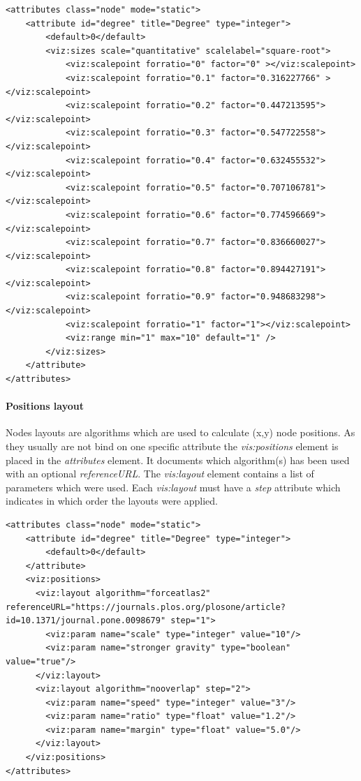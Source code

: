 \documentclass[a4paper,10pt]{article}
\begin{document}
\lstset{ style=gexf }
\begin{lstlisting}[caption={Quantitative size scale},label=vizscalesizequanti]
<attributes class="node" mode="static">
    <attribute id="degree" title="Degree" type="integer">
        <default>0</default>
        <viz:sizes scale="quantitative" scalelabel="square-root">
            <viz:scalepoint forratio="0" factor="0" ></viz:scalepoint>
            <viz:scalepoint forratio="0.1" factor="0.316227766" ></viz:scalepoint>
            <viz:scalepoint forratio="0.2" factor="0.447213595"></viz:scalepoint>
            <viz:scalepoint forratio="0.3" factor="0.547722558"></viz:scalepoint>
            <viz:scalepoint forratio="0.4" factor="0.632455532"></viz:scalepoint>
            <viz:scalepoint forratio="0.5" factor="0.707106781"></viz:scalepoint>
            <viz:scalepoint forratio="0.6" factor="0.774596669"></viz:scalepoint>
            <viz:scalepoint forratio="0.7" factor="0.836660027"></viz:scalepoint>
            <viz:scalepoint forratio="0.8" factor="0.894427191"></viz:scalepoint>
            <viz:scalepoint forratio="0.9" factor="0.948683298"></viz:scalepoint>
            <viz:scalepoint forratio="1" factor="1"></viz:scalepoint>
            <viz:range min="1" max="10" default="1" />
        </viz:sizes>
    </attribute>
</attributes>
\end{lstlisting}

\paragraph{Positions layout} Nodes layouts are algorithms which are used to calculate (x,y) node positions. As they usually are not bind on one specific attribute the \textit{vis:positions} element is placed in the \textit{attributes} element. It documents which algorithm(s) has been used with an optional \textit{referenceURL}. The \textit{vis:layout} element contains a list of parameters which were used. Each \textit{vis:layout} must have a \textit{step} attribute which indicates in which order the layouts were applied.

\lstset{ style=gexf }
\begin{lstlisting}[caption={Positions layout},label=vizpositionlayout]
<attributes class="node" mode="static">
    <attribute id="degree" title="Degree" type="integer">
        <default>0</default>
    </attribute>
    <viz:positions> 
      <viz:layout algorithm="forceatlas2" referenceURL="https://journals.plos.org/plosone/article?id=10.1371/journal.pone.0098679" step="1">
        <viz:param name="scale" type="integer" value="10"/>
        <viz:param name="stronger gravity" type="boolean" value="true"/>
      </viz:layout>
      <viz:layout algorithm="nooverlap" step="2">
        <viz:param name="speed" type="integer" value="3"/>
        <viz:param name="ratio" type="float" value="1.2"/>
        <viz:param name="margin" type="float" value="5.0"/>
      </viz:layout>  
    </viz:positions>
</attributes>
\end{lstlisting}
\end{document}
